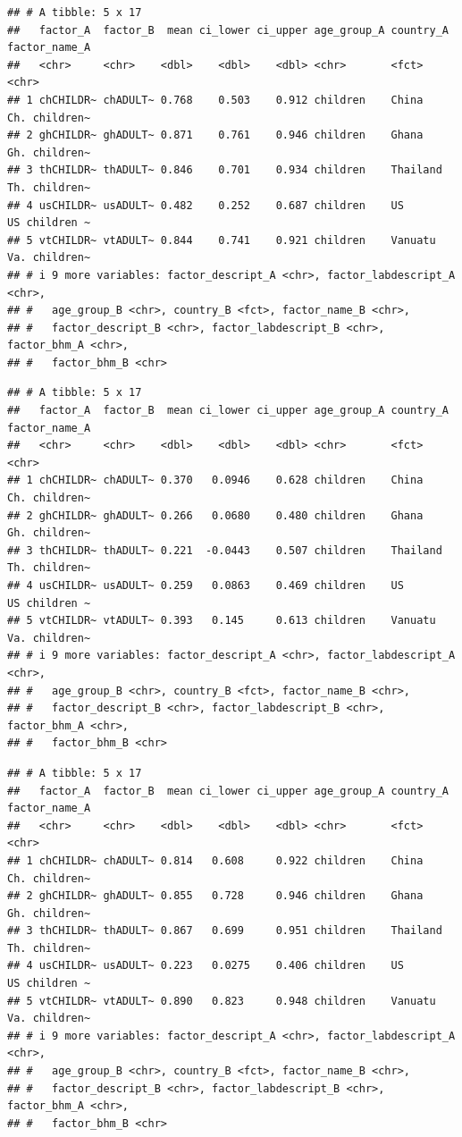 \documentclass[
  man]{apa6}
\begin{document}
\begin{verbatim}
## # A tibble: 5 x 17
##   factor_A  factor_B  mean ci_lower ci_upper age_group_A country_A factor_name_A
##   <chr>     <chr>    <dbl>    <dbl>    <dbl> <chr>       <fct>     <chr>        
## 1 chCHILDR~ chADULT~ 0.768    0.503    0.912 children    China     Ch. children~
## 2 ghCHILDR~ ghADULT~ 0.871    0.761    0.946 children    Ghana     Gh. children~
## 3 thCHILDR~ thADULT~ 0.846    0.701    0.934 children    Thailand  Th. children~
## 4 usCHILDR~ usADULT~ 0.482    0.252    0.687 children    US        US children ~
## 5 vtCHILDR~ vtADULT~ 0.844    0.741    0.921 children    Vanuatu   Va. children~
## # i 9 more variables: factor_descript_A <chr>, factor_labdescript_A <chr>,
## #   age_group_B <chr>, country_B <fct>, factor_name_B <chr>,
## #   factor_descript_B <chr>, factor_labdescript_B <chr>, factor_bhm_A <chr>,
## #   factor_bhm_B <chr>
\end{verbatim}

\begin{verbatim}
## # A tibble: 5 x 17
##   factor_A  factor_B  mean ci_lower ci_upper age_group_A country_A factor_name_A
##   <chr>     <chr>    <dbl>    <dbl>    <dbl> <chr>       <fct>     <chr>        
## 1 chCHILDR~ chADULT~ 0.370   0.0946    0.628 children    China     Ch. children~
## 2 ghCHILDR~ ghADULT~ 0.266   0.0680    0.480 children    Ghana     Gh. children~
## 3 thCHILDR~ thADULT~ 0.221  -0.0443    0.507 children    Thailand  Th. children~
## 4 usCHILDR~ usADULT~ 0.259   0.0863    0.469 children    US        US children ~
## 5 vtCHILDR~ vtADULT~ 0.393   0.145     0.613 children    Vanuatu   Va. children~
## # i 9 more variables: factor_descript_A <chr>, factor_labdescript_A <chr>,
## #   age_group_B <chr>, country_B <fct>, factor_name_B <chr>,
## #   factor_descript_B <chr>, factor_labdescript_B <chr>, factor_bhm_A <chr>,
## #   factor_bhm_B <chr>
\end{verbatim}

\begin{verbatim}
## # A tibble: 5 x 17
##   factor_A  factor_B  mean ci_lower ci_upper age_group_A country_A factor_name_A
##   <chr>     <chr>    <dbl>    <dbl>    <dbl> <chr>       <fct>     <chr>        
## 1 chCHILDR~ chADULT~ 0.814   0.608     0.922 children    China     Ch. children~
## 2 ghCHILDR~ ghADULT~ 0.855   0.728     0.946 children    Ghana     Gh. children~
## 3 thCHILDR~ thADULT~ 0.867   0.699     0.951 children    Thailand  Th. children~
## 4 usCHILDR~ usADULT~ 0.223   0.0275    0.406 children    US        US children ~
## 5 vtCHILDR~ vtADULT~ 0.890   0.823     0.948 children    Vanuatu   Va. children~
## # i 9 more variables: factor_descript_A <chr>, factor_labdescript_A <chr>,
## #   age_group_B <chr>, country_B <fct>, factor_name_B <chr>,
## #   factor_descript_B <chr>, factor_labdescript_B <chr>, factor_bhm_A <chr>,
## #   factor_bhm_B <chr>
\end{verbatim}
\end{document}
